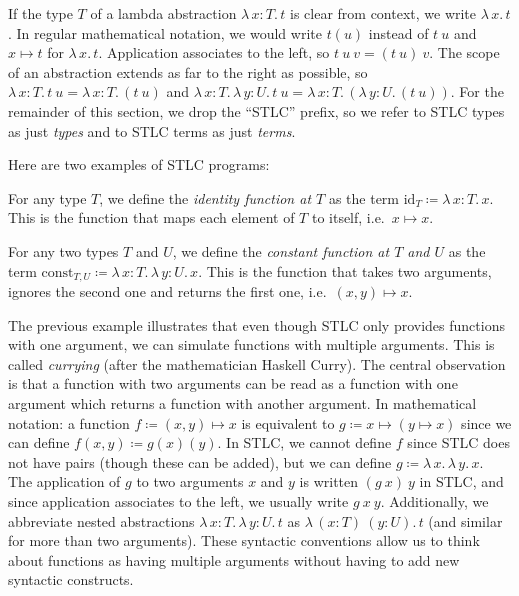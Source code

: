 \documentclass{article}
\theoremstyle{definition}
\newcommand{\id}{\mathrm{id}}
\newcommand{\const}{\mathrm{const}}
\newcommand{\Lam}[2]{λ\,#1.\, #2}
\begin{document}
If the type $T$ of a lambda abstraction $\Lam{x : T}{t}$ is clear from context, we write $\Lam{x}{t}$.
In regular mathematical notation, we would write $t(u)$ instead of $t~u$ and $x ↦ t$ for $\Lam{x}{t}$.
Application associates to the left, so $t~u~v = (t~u)~v$.
The scope of an abstraction extends as far to the right as possible, so $\Lam{x : T}{t~u} = \Lam{x : T}{(t~u)}$ and $\Lam{x : T}{\Lam{y : U}{t~u}} = \Lam{x : T}{(\Lam{y : U}{(t~u)})}$.
For the remainder of this section, we drop the \enquote{STLC} prefix, so we refer to STLC types as just \emph{types} and to STLC terms as just \emph{terms}.

Here are two examples of STLC programs:

\begin{example}
  For any type $T$, we define the \emph{identity function at $T$} as the term $\id_{T} \coloneqq \Lam{x : T}{x}$.
  This is the function that maps each element of $T$ to itself, i.e.\ $x \mapsto x$.
\end{example}

\begin{example}
  For any two types $T$ and $U$, we define the \emph{constant function at $T$ and $U$} as the term $\const_{T,U} \coloneqq \Lam{x : T}{\Lam{y : U}{x}}$.
  This is the function that takes two arguments, ignores the second one and returns the first one, i.e.\ $(x, y) ↦ x$.
\end{example}

The previous example illustrates that even though STLC only provides functions with one argument, we can simulate functions with multiple arguments.
This is called \emph{currying} (after the mathematician Haskell Curry).
The central observation is that a function with two arguments can be read as a function with one argument which returns a function with another argument.
In mathematical notation: a function $f \coloneqq (x, y) ↦ x$ is equivalent to $g \coloneqq x ↦ (y ↦ x)$ since we can define $f(x, y) \coloneqq g(x)(y)$.
In STLC, we cannot define $f$ since STLC does not have pairs (though these can be added), but we can define $g \coloneqq \Lam{x}{\Lam{y}{x}}$.
The application of $g$ to two arguments $x$ and $y$ is written $(g~x)~y$ in STLC, and since application associates to the left, we usually write $g~x~y$.
Additionally, we abbreviate nested abstractions $\Lam{x : T}{\Lam{y : U}{t}}$ as $\Lam{(x : T)~(y : U)}{t}$ (and similar for more than two arguments).
These syntactic conventions allow us to think about functions as having multiple arguments without having to add new syntactic constructs.
\end{document}
